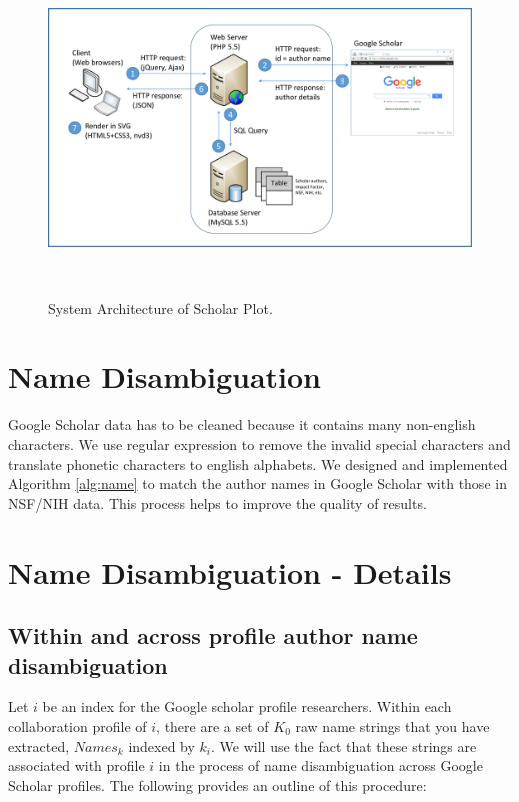 \begin{figure}
\centering
  \includegraphics[width=1\columnwidth]{figures/fig_system_architecture.pdf}
  \caption{System Architecture of Scholar Plot.}~\label{fig:fig-arch}
\end{figure}


\section{Name Disambiguation}
Google Scholar data has to be cleaned because it contains many non-english characters. We use regular expression to remove the invalid special characters and translate phonetic characters to english alphabets. We designed and implemented Algorithm \ref{alg:name} to match the author names in Google Scholar with those in NSF/NIH data. This process helps to improve the quality of results. 




\section{Name Disambiguation - Details}
\subsection{Within and across profile author name disambiguation}

Let $i$ be an index for the Google scholar profile researchers. Within each collaboration profile of $i$,  there are a set of $K_{0}$ raw name strings that you have extracted,  $Names_{k}$ indexed by $k_{i}$. We will use the fact that these strings are associated with profile $i$ in the process of name disambiguation across Google Scholar profiles. The following provides an outline of this procedure: \\


